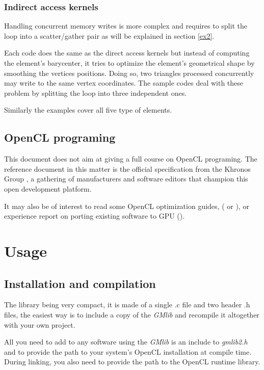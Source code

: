 \documentclass[a4paper,12pt]{article}
\begin{document}
\subsubsection*{Indirect access kernels}
Handling concurrent memory writes is more complex and requires to split the loop into a scatter/gather pair as will be explained in section \ref{ex2}.

Each code does the same as the direct access kernels but instead of computing the element's barycenter, it tries to optimize the element's geometrical shape by smoothing the vertices positions. Doing so, two triangles processed concurrently may write to the same vertex coordinates. The sample codes deal with these problem by splitting the loop into three independent ones.

Similarly the examples cover all five type of elements.


\subsection{OpenCL programing}
This document does not aim at giving a full course on OpenCL programing. The reference document in this matter is the official specification from the Khronos Group \cite{khronos}, a gathering of manufacturers and software editors that champion this open development platform.

It may also be of interest to read some OpenCL optimization guides, (\cite{nvidia} or \cite{apple}), or experience report on porting existing software to GPU (\cite{lohner}).


%
%

\section{Usage}
\label{util}
\subsection{Installation and compilation}
The library being very compact, it is made of a single .c file and two header .h files, the easiest way is to include a copy of the \emph{GMlib} and recompile it altogether with your own project.

All you need to add to any software using the \emph{GMlib} is an include to \emph{gmlib2.h} and to provide the path to your system's OpenCL installation at compile time. During linking, you also need to provide the path to the OpenCL runtime library.
\end{document}
